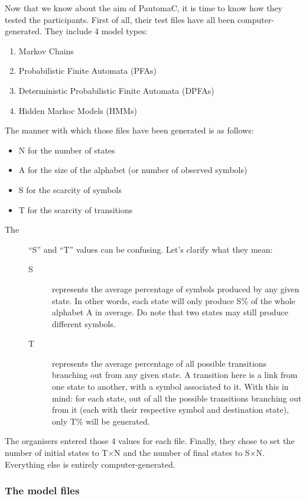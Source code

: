 Now that we know about the aim of PautomaC, it is time to know how
they tested the participants. First of all, their test files have
all been computer-generated. They include 4 model types:
\begin{enumerate}
\item Markov Chains
\item Probabilistic Finite Automata (PFAs)
\item Deterministic Probabilistic Finite Automata (DPFAs)
\item Hidden Markoc Models (HMMs)
\end{enumerate}
The manner with which those files have been generated is as follows:
\begin{itemize}
\item N for the number of states
\item A for the size of the alphabet (or number of observed symbols)
\item S for the scarcity of symbols
\item T for the scarcity of transitions\end{itemize}
\begin{description}
\item [{\textmd{The}}] ``S'' and ``T'' values can be confusing. Let's
clarify what they mean:

\begin{description}
\item [{S}] represents the average percentage of symbols produced by any
given state. In other words, each state will only produce S\% of the
whole alphabet A in average. Do note that two states may still produce
different symbols.
\item [{T}] represents the average percentage of all possible transitions
branching out from any given state. A transition here is a link from
one state to another, with a symbol associated to it. With this in
mind: for each state, out of all the possible transitions branching
out from it (each with their respective symbol and destination state),
only T\% will be generated.
\end{description}
\end{description}
The organisers entered those 4 values for each file. Finally, they
chose to set the number of initial states to T$\times$N and the number
of final states to S$\times$N. Everything else is entirely computer-generated. 


\subsubsection{The model files}

